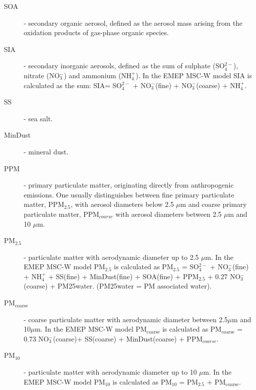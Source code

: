 \begin{description}

\item[SOA] - secondary organic aerosol, defined as the aerosol mass
  arising from the oxidation products of gas-phase organic species.

\item[SIA]- secondary inorganic aerosols, defined as the sum of
  sulphate (SO$^{2-}_4$), nitrate (NO$^-_3$) and ammonium (NH$^+_4$).
  In the EMEP MSC-W model SIA is calculated as the sum: SIA= SO$^{2-}_4$
  + NO$^-_3$(fine) + NO$^-_3$(coarse) + NH$^+_4$.

\item[SS] - sea salt.

\item[MinDust] - mineral dust.

\item[PPM] - primary particulate matter, originating directly from
  anthropogenic emissions. One usually distinguishes between fine
  primary particulate matter, PPM$_{2.5}$, with aerosol diameters
  below 2.5 $\mu$m and coarse primary particulate matter, PPM$_{coarse}$
  with aerosol diameters between 2.5 $\mu$m and 10 $\mu$m.

\item[PM$_{2.5}$] - particulate matter with aerodynamic diameter
  up to 2.5 $\mu$m. In the EMEP
  MSC-W model PM$_{2.5}$ is calculated as PM$_{2.5}$ = SO$^{2-}_4$
  + NO$^-_3$(fine) + NH$^+_4$ + SS(fine) + MinDust(fine)
  + SOA(fine) + PPM$_{2.5}$ + 0.27 NO$^-_3$(coarse) + PM25water.
  (PM25water = PM associated water).

\item[PM$_{\text{coarse}}$] - coarse particulate matter with aerodynamic
  diameter between 2.5$\mu$m 
  and 10$\mu$m. In the EMEP MSC-W model PM$_{\text{coarse}}$ is calculated
  as PM$_{\text{coarse}}$ = 0.73 NO$^-_3$(coarse)+ SS(coarse)
  + MinDust(coarse) + PPM$_{coarse}$.

\item[PM$_{10}$] - particulate matter with aerodynamic diameter
  up to 10 $\mu$m. In the EMEP
   MSC-W model PM$_{10}$ is calculated as PM$_{10}$ = PM$_{2.5}$
  + PM$_{\text{coarse}}$.

\end{description}

